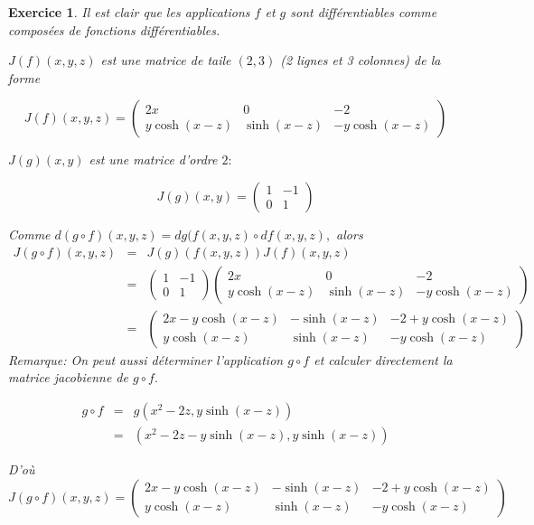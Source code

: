 \documentclass[11pt,a4paper]{report}
\newtheorem{exo}{Exercice}[section]
\begin{document}
\begin{exo}
Il est clair que les applications $f$ et $g$ sont différentiables comme composées de fonctions différentiables.

$J(f)(x,y,z)$ est une matrice  de taile $(2,3)$ (2 lignes et 3 colonnes) de la forme

\begin{equation*}
J(f)(x,y,z)=\begin{pmatrix}
2x & 0 & -2 \\
y\cosh(x-z) & \sinh(x-z) & -y\cosh(x-z)
\end{pmatrix}
\end{equation*}

$J(g)(x,y)$ est une matrice d'ordre $2:$

\begin{equation*}
J(g)(x,y)=\begin{pmatrix}
1 &-1 \\
0 & 1
\end{pmatrix}
\end{equation*}

Comme $d(g\circ f)(x,y,z)=dg(f(x,y,z)\circ df(x,y,z),$ alors
\begin{eqnarray*}
J(g\circ f)(x,y,z)
&=& J(g)(f(x,y,z))J(f)(x,y,z)\\
&=&\begin{pmatrix}
1 &-1 \\
0 & 1
\end{pmatrix}
\begin{pmatrix}
2x & 0 & -2 \\
y\cosh(x-z) & \sinh(x-z) & -y\cosh(x-z)
\end{pmatrix}\\
&=&\begin{pmatrix}
2x-y\cosh(x-z) & -\sinh(x-z) & -2+y\cosh(x-z) \\
y\cosh(x-z) & \sinh(x-z) & -y\cosh(x-z)
\end{pmatrix}
\end{eqnarray*}
Remarque: On peut aussi déterminer l'application $g\circ f$ et calculer directement la matrice jacobienne de $g\circ f.$

\begin{eqnarray*}
g\circ f
&=& g(x^2-2z,y\sinh(x-z))\\
&=& (x^2-2z-y\sinh(x-z),y\sinh(x-z))
\end{eqnarray*}

D'où
\begin{equation*}
J(g\circ f)(x,y,z)=\begin{pmatrix}
2x-y\cosh(x-z) & -\sinh(x-z) & -2+y\cosh(x-z) \\
y\cosh(x-z) & \sinh(x-z) & -y\cosh(x-z)
\end{pmatrix}
\end{equation*}
\end{exo}
\end{document}
